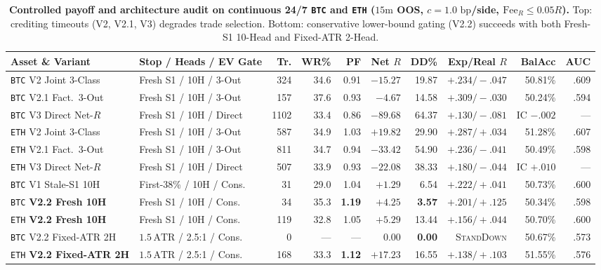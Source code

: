 \documentclass{article}
\newcommand{\FeeR}{\mathrm{Fee}_R}
\newcommand{\ATR}{\mathrm{ATR}}
\begin{document}
\begin{table}[t]
  \centering
  \caption{\textbf{Controlled payoff and architecture audit on continuous 24/7 \texttt{BTC} and \texttt{ETH} ($15\text{m}$ OOS, $c=1.0\text{ bp}$/side, $\FeeR \le 0.05R$).} Top: crediting timeouts (V2, V2.1, V3) degrades trade selection. Bottom: conservative lower-bound gating (V2.2) succeeds with both Fresh-S1 10-Head and Fixed-ATR 2-Head.}
  \label{tab:btc_eth_audit}
  \scriptsize
  \setlength{\tabcolsep}{3.0pt}
  \begin{tabular}{@{}llrrrrrrrr@{}}
    \toprule
    Asset \& Variant & Stop / Heads / EV Gate & Tr. & WR\% & PF & Net $R$ & DD\% & Exp/Real $R$ & BalAcc & AUC \\
    \midrule
    \texttt{BTC} V2 Joint 3-Class & Fresh S1 / 10H / 3-Out & 324 & 34.6 & 0.91 & $-15.27$ & 19.87 & $+.234/-.047$ & 50.81\% & .609 \\
    \texttt{BTC} V2.1 Fact.\ 3-Out & Fresh S1 / 10H / 3-Out & 157 & 37.6 & 0.93 & $-4.67$ & 14.58 & $+.309/-.030$ & 50.24\% & .594 \\
    \texttt{BTC} V3 Direct Net-$R$ & Fresh S1 / 10H / Direct & 1102 & 33.4 & 0.86 & $-89.68$ & 64.37 & $+.130/-.081$ & IC $-.002$ & --- \\
    \texttt{ETH} V2 Joint 3-Class & Fresh S1 / 10H / 3-Out & 587 & 34.9 & 1.03 & $+19.82$ & 29.90 & $+.287/+.034$ & 51.28\% & .607 \\
    \texttt{ETH} V2.1 Fact.\ 3-Out & Fresh S1 / 10H / 3-Out & 811 & 34.7 & 0.94 & $-33.42$ & 54.90 & $+.236/-.041$ & 50.49\% & .598 \\
    \texttt{ETH} V3 Direct Net-$R$ & Fresh S1 / 10H / Direct & 507 & 33.9 & 0.93 & $-22.08$ & 38.33 & $+.180/-.044$ & IC $+.010$ & --- \\
    \midrule
    \texttt{BTC} V1 Stale-S1 10H & First-38\% / 10H / Cons. & 31 & 29.0 & 1.04 & $+1.29$ & 6.54 & $+.222/+.041$ & 50.73\% & .600 \\
    \texttt{BTC} \textbf{V2.2 Fresh 10H} & Fresh S1 / 10H / Cons. & 34 & 35.3 & \textbf{1.19} & $\mathbf{+4.25}$ & \textbf{3.57} & $+.201/+.125$ & 50.34\% & .598 \\
    \texttt{ETH} \textbf{V2.2 Fresh 10H} & Fresh S1 / 10H / Cons. & 119 & 32.8 & 1.05 & $+5.29$ & 13.44 & $+.156/+.044$ & 50.70\% & .600 \\
    \texttt{BTC} V2.2 Fixed-ATR 2H & $1.5\,\ATR$ / 2.5:1 / Cons. & 0 & --- & --- & $0.00$ & \textbf{0.00} & \textsc{StandDown} & 50.67\% & .573 \\
    \texttt{ETH} \textbf{V2.2 Fixed-ATR 2H} & $1.5\,\ATR$ / 2.5:1 / Cons. & 168 & 33.3 & \textbf{1.12} & $\mathbf{+17.23}$ & 16.55 & $\mathbf{+.138/+.103}$ & 51.55\% & .576 \\
    \bottomrule
  \end{tabular}
\end{table}
\end{document}
